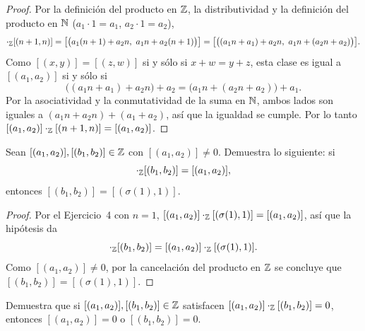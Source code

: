 \documentclass[12pt,a4paper]{article}
\begin{document}
    \begin{proof}
        Por la definición del producto en $\mathbb{Z}$, la distributividad y la definición del producto en $\mathbb{N}$
        ($a_1\cdot1=a_1$, $a_2\cdot1=a_2$),
        \begin{equation*}
            [(a_1,a_2)]\cdot_{\Z}[(n+1,n)]=\big[\big(a_1(n+1)+a_2n,\ a_1n+a_2(n+1)\big)\big]
            =\big[\big((a_1n+a_1)+a_2n,\ a_1n+(a_2n+a_2)\big)\big].
        \end{equation*}
        Como $[(x,y)]=[(z,w)]$ si y sólo si $x+w=y+z$, esta clase es igual a $[(a_1,a_2)]$ si y sólo si
        \begin{equation*}
            \big((a_1n+a_1)+a_2n\big)+a_2=\big(a_1n+(a_2n+a_2)\big)+a_1.
        \end{equation*}
        Por la asociatividad y la conmutatividad de la suma en $\mathbb{N}$, ambos lados son iguales a
        $(a_1n+a_2n)+(a_1+a_2)$, así que la igualdad se cumple. Por lo tanto
        $[(a_1,a_2)]\cdot_{\mathbb{Z}}[(n+1,n)]=[(a_1,a_2)]$.
    \end{proof}

    \begin{problema}
        Sean $[(a_1,a_2)],[(b_1,b_2)]\in\mathbb{Z}$ con $[(a_1,a_2)]\neq0$. Demuestra lo siguiente: si
        \begin{equation*}
            [(a_1,a_2)]\cdot_{\Z}[(b_1,b_2)]=[(a_1,a_2)],
        \end{equation*}
        entonces $[(b_1,b_2)]=[(\sigma(1),1)]$.
    \end{problema}

    \begin{proof}
        Por el Ejercicio~4 con $n=1$, $[(a_1,a_2)]\cdot_{\mathbb{Z}}[(\sigma(1),1)]=[(a_1,a_2)]$, así que la hipótesis da
        \begin{equation*}
            [(a_1,a_2)]\cdot_{\Z}[(b_1,b_2)]=[(a_1,a_2)]\cdot_{\Z}[(\sigma(1),1)].
        \end{equation*}
        Como $[(a_1,a_2)]\neq0$, por la cancelación del producto en $\mathbb{Z}$ se concluye que
        $[(b_1,b_2)]=[(\sigma(1),1)]$.
    \end{proof}

    \begin{problema}
        Demuestra que si $[(a_1,a_2)],[(b_1,b_2)]\in\mathbb{Z}$ satisfacen $[(a_1,a_2)]\cdot_{\mathbb{Z}}[(b_1,b_2)]=0$, entonces
        $[(a_1,a_2)]=0$ o $[(b_1,b_2)]=0$.
    \end{problema}
\end{document}
